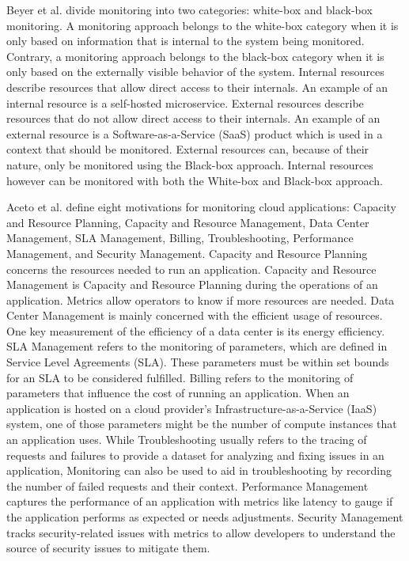 Beyer et al. \cite{BJ+16} divide monitoring into two categories: white-box and black-box monitoring.
A monitoring approach belongs to the white-box category when it is only based on information that is
internal to the system being monitored. Contrary, a monitoring approach belongs to the black-box category
when it is only based on the externally visible behavior of the system.
Internal resources describe resources that allow direct access to their internals.
An example of an internal resource is a self-hosted microservice.
External resources describe resources that do not allow direct access to their internals.
An example of an external resource is a Software-as-a-Service (SaaS) product which is used in a context that should be monitored.
External resources can, because of their nature, only be monitored using the Black-box approach.
Internal resources however can be monitored with both the White-box and Black-box approach.

Aceto et al. \cite{AB+12} define eight motivations for monitoring cloud applications:
Capacity and Resource Planning, Capacity and Resource Management, Data Center Management,
SLA Management, Billing, Troubleshooting, Performance Management, and Security Management.
Capacity and Resource Planning concerns the resources needed to run an application.
Capacity and Resource Management is Capacity and Resource Planning during the operations
of an application. Metrics allow operators to know if more resources are needed.
Data Center Management is mainly concerned with the efficient usage of resources.
One key measurement of the efficiency of a data center is its energy efficiency.
SLA Management refers to the monitoring of parameters, which are defined in Service Level Agreements (SLA).
These parameters must be within set bounds for an SLA to be considered fulfilled.
Billing refers to the monitoring of parameters that influence the cost of running an application.
When an application is hosted on a cloud provider's Infrastructure-as-a-Service (IaaS) system,
one of those parameters might be the number of compute instances that an application uses.
While Troubleshooting usually refers to the tracing of requests and failures to provide a dataset for analyzing and fixing issues in an application,
Monitoring can also be used to aid in troubleshooting by recording the number of failed requests and their context.
Performance Management captures the performance of an application with metrics like
latency to gauge if the application performs as expected or needs adjustments.
Security Management tracks security-related issues with metrics to allow developers to understand
the source of security issues to mitigate them.

